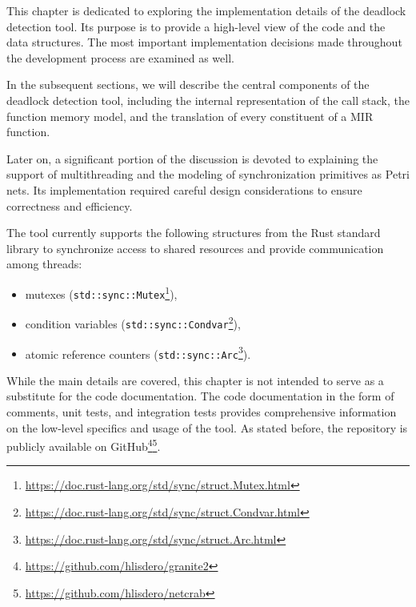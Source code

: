 This chapter is dedicated to exploring
the implementation details of the deadlock detection tool.
Its purpose is to provide a high-level view of the code and the data structures.
The most important implementation decisions made throughout the development process
are examined as well.

In the subsequent sections,
we will describe the central components of the deadlock detection tool,
including the internal representation of the call stack, the function memory model,
and the translation of every constituent of a \acrshort{MIR} function.

Later on, a significant portion of the discussion is devoted to explaining
the support of multithreading and the modeling of synchronization primitives as Petri nets.
Its implementation required careful design considerations
to ensure correctness and efficiency.

The tool currently supports the following structures
from the Rust standard library to synchronize access to shared resources
and provide communication among threads:

\begin{itemize}
  \item mutexes (\texttt{std::sync::Mutex}\footnote{\url{https://doc.rust-lang.org/std/sync/struct.Mutex.html}}),
  \item condition variables (\texttt{std::sync::Condvar}\footnote{\url{https://doc.rust-lang.org/std/sync/struct.Condvar.html}}),
  \item atomic reference counters (\texttt{std::sync::Arc}\footnote{\url{https://doc.rust-lang.org/std/sync/struct.Arc.html}}).
\end{itemize}

While the main details are covered, this chapter is not intended
to serve as a substitute for the code documentation.
The code documentation in the form of comments, unit tests, and integration tests
provides comprehensive information on the low-level specifics and usage of the tool.
As stated before, the repository is publicly available on
GitHub\footnote{\url{https://github.com/hlisdero/granite2}}\footnote{\url{https://github.com/hlisdero/netcrab}}.